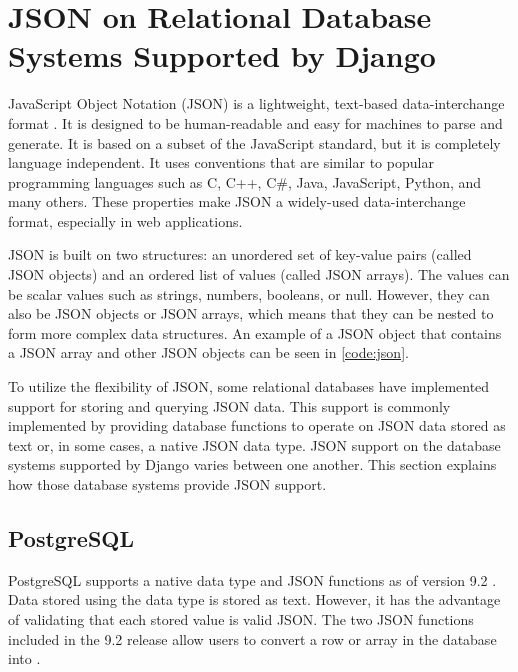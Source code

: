 \section{JSON on Relational Database Systems Supported by Django}

JavaScript Object Notation (JSON) is a lightweight, text-based data-interchange
format \cite{json}. It is designed to be human-readable and easy for machines
to parse and generate. It is based on a subset of the JavaScript standard, but
it is completely language independent. It uses conventions that are similar to
popular programming languages such as C, C++, C\#, Java, JavaScript, Python,
and many others. These properties make JSON a widely-used data-interchange
format, especially in web applications.

JSON is built on two structures: an unordered set of key-value pairs (called
JSON objects) and an ordered list of values (called JSON arrays). The values
can be scalar values such as strings, numbers, booleans, or null. However, they
can also be JSON objects or JSON arrays, which means that they can be nested to
form more complex data structures. An example of a JSON object that contains a
JSON array and other JSON objects can be seen in \autoref{code:json}.



To utilize the flexibility of JSON, some relational databases have implemented
support for storing and querying JSON data. This support is commonly
implemented by providing database functions to operate on JSON data stored as
text or, in some cases, a native JSON data type. JSON support on the database
systems supported by Django varies between one another. This section explains
how those database systems provide JSON support.

\subsection{PostgreSQL}

PostgreSQL supports a native  data type and JSON functions as of
version 9.2 \cite{postgresql:9.2}. Data stored using the  data type
is stored as text. However, it has the advantage of validating that each stored
value is valid JSON. The two JSON functions included in the 9.2 release allow
users to convert a row or array in the database into .

